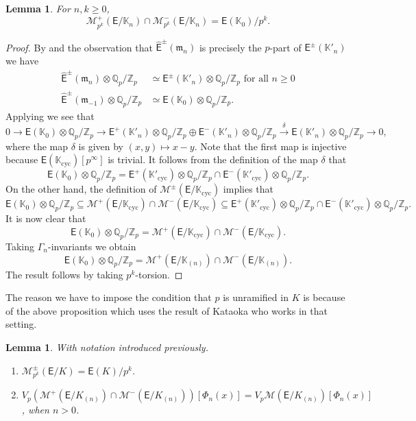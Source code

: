 \documentclass{amsart}
\newtheorem{lemma}[theorem]{Lemma}
\numberwithin{equation}{section}
\theoremstyle{remark}
\newcommand{\EC}{\mathsf{E}}
\newcommand{\fm}{\mathfrak{m}}
\newcommand{\cM}{\mathcal{M}}
\newcommand{\Qp}{\mathbb{Q}_p}
\newcommand{\Kn}{\mathbb{K}_{n}}
\newcommand{\K}{\mathbb{K}}
\newcommand{\Zp}{\mathbb{Z}_p}
\newcommand{\cyc}{\operatorname{{cyc}}}
\theoremstyle{plain} %
\begin{document}
\begin{lemma}
\label{Lemma 1 note 20 May}
For $n,k \geq 0$,
\[
\cM^{+}_{p^k}(\EC/\Kn) \cap \cM^{-}_{p^k}(\EC/\Kn) = \EC(\K_0)/p^k.
\]
\end{lemma}

\begin{proof}
By \cite[Proposition~3.10]{Kat21} and the observation that $\hat{\EC}^{\pm}(\fm_n)$ is precisely the $p$-part of $\EC^{\pm}(\K'_n)$ we have
\begin{align*}
\hat{\EC}^{\pm}(\fm_n) \otimes \Qp/\Zp &\simeq \EC^{\pm}(\K'_n) \otimes \Qp/\Zp \text{ for all }n \geq 0\\
\hat{\EC}^{\pm}(\fm_{-1}) \otimes \Qp/\Zp &\simeq \EC(\K_0) \otimes \Qp/\Zp.
\end{align*}
Applying \cite[Proposition~4.21(2)]{Kat21} we see that
\[
0 \longrightarrow \EC(\K_0) \otimes \Qp/\Zp \longrightarrow \EC^{+}(\K'_n) \otimes \Qp/\Zp \oplus \EC^{-}(\K'_n) \otimes \Qp/\Zp \xrightarrow{\delta} \EC(\K'_n) \otimes \Qp/\Zp \longrightarrow 0,
\]
where the map $\delta$ is given by $(x,y) \mapsto x-y$.
Note that the first map is injective because $\EC(\K_{\cyc})[p^\infty]$ is trivial.
It follows from the definition of the map $\delta$ that
\[
\EC(\K_0) \otimes \Qp/\Zp = \EC^{+}(\K'_{\cyc}) \otimes \Qp/\Zp \cap \EC^{-}(\K'_{\cyc}) \otimes \Qp/\Zp.
\]
On the other hand, the definition of $\cM^{\pm}(\EC/\K_{\cyc})$ implies that
\[
\EC(\K_0) \otimes \Qp/\Zp \subseteq \cM^{+}(\EC/\K_{\cyc}) \cap \cM^{-}(\EC/\K_{\cyc}) \subseteq \EC^{+}(\K'_{\cyc}) \otimes \Qp/\Zp \cap \EC^{-}(\K'_{\cyc}) \otimes \Qp/\Zp.
\]
It is now clear that 
\[
\EC(\K_0) \otimes \Qp/\Zp = \cM^{+}(\EC/\K_{\cyc}) \cap \cM^{-}(\EC/\K_{\cyc}).
\]
Taking $\Gamma_n$-invariants we obtain
\[
\EC(\K_0) \otimes \Qp/\Zp = \cM^{+}(\EC/\K_{(n)}) \cap \cM^{-}(\EC/\K_{(n)}).
\]
The result follows by taking $p^k$-torsion.
\end{proof}

The reason we have to impose the condition that $p$ is unramified in $K$ is because of the above proposition which uses the result of Kataoka who works in that setting.

\begin{lemma}
\label{Lemma 2 note 20 May}
With notation introduced previously.
\begin{enumerate}
\item[\textup{(}i\textup{)}] $\cM^{\pm}_{p^k}(\EC/K) = \EC(K)/p^k$.
\item[\textup{(}ii\textup{)}] $V_p(\cM^{+}(\EC/K_{(n)}) \cap \cM^{-}(\EC/K_{(n)}))[\Phi_n(x)] = V_p \cM(\EC/K_{(n)})[\Phi_n(x)]$, when $n>0$.
\end{enumerate}
\end{lemma}
\end{document}
